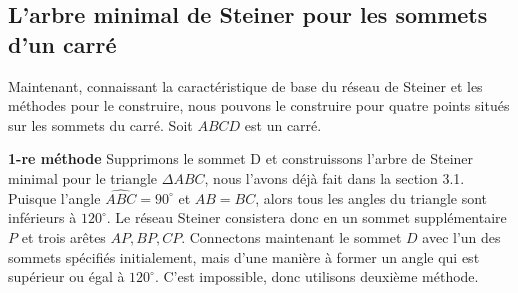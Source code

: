 \documentclass[10pt,a4paper]{article}%
\theoremstyle{theorem}
\theoremstyle{definition}
\begin{document}
\begin{enumerate}
\begin{center}
        			\end{center}
        		
        		\end{enumerate}
        \subsection{L'arbre minimal de Steiner pour les sommets d'un carré}
        	
			Maintenant, connaissant la caractéristique de base du réseau de Steiner et les méthodes pour le construire, nous pouvons le construire pour quatre points situés sur les sommets du carré.
		    Soit $ABCD$ est un carré.
		        
		    \textbf{1-re méthode} Supprimons le sommet D et construissons l'arbre de Steiner minimal pour le triangle $\Delta ABC$, nous l'avons déjà fait dans la section 3.1. Puisque l'angle $\widehat{ABC}=90^\circ$ et $AB=BC$, alors tous les angles du triangle sont inférieurs à $120^\circ$. Le réseau Steiner consistera donc en un sommet supplémentaire $P$ et trois arêtes $AP,BP,CP$. Connectons maintenant le sommet $D$ avec l'un des sommets spécifiés initialement, mais d'une manière à former un angle qui est supérieur ou égal à $120^\circ$. C'est impossible, donc utilisons deuxième méthode.
		         
\end{document}
